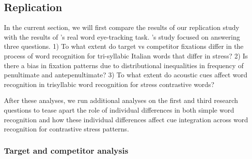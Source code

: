 \subsection{Replication}

In the current section, we will first compare the results of our replication study with the results of \cite{Sulpizio_McQueen_2012}'s real word eye-tracking task. \cite{Sulpizio_McQueen_2012}'s study focused on answering three questions. 1) To what extent do target vs competitor fixations differ in the process of word recognition for tri-syllabic Italian words that differ in stress? 2) Is there a bias in fixation patterns due to distributional inequalities in frequency of penultimate and antepenultimate? 3) To what extent do acoustic cues affect word recognition in trisyllabic word recognition for stress contrastive words? 

After these analyses, we run additional analyses on the first and third research questions to tease apart the role of individual differences in both simple word recognition and how these individual differences affect cue integration across word recognition for contrastive stress patterns. 


\subsubsection{Target and competitor analysis}

